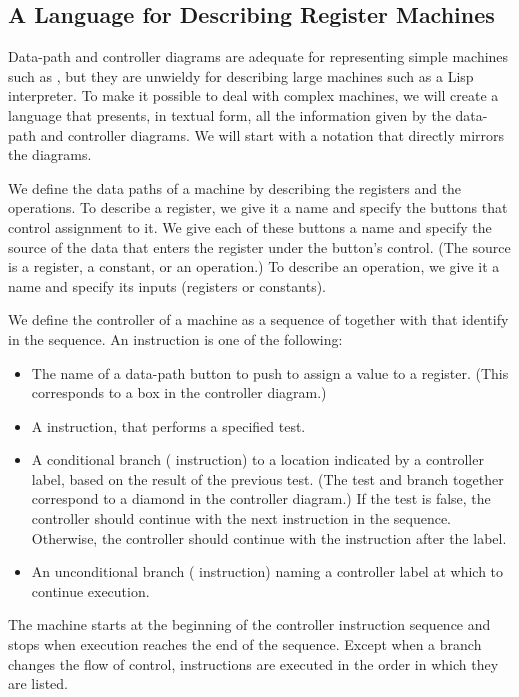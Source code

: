 \subsection{A Language for Describing Register Machines}
\label{Section 5.1.1}

Data-path and controller diagrams are adequate for representing simple machines such as , but they are unwieldy for describing large machines such as a Lisp interpreter.
To make it possible to deal with complex machines, we will create a language that presents, in textual form, all the information given by the data-path and controller diagrams.
We will start with a notation that directly mirrors the diagrams.

We define the data paths of a machine by describing the registers and the operations.
To describe a register, we give it a name and specify the buttons that control assignment to it.
We give each of these buttons a name and specify the source of the data that enters the register under the button’s control.
(The source is a register, a constant, or an operation.)
To describe an operation, we give it a name and specify its inputs (registers or constants).

We define the controller of a machine as a sequence of  together with  that identify  in the sequence.
An instruction is one of the following:
\begin{itemize}

	\item
		The name of a data-path button to push to assign a value to a register.
		(This corresponds to a box in the controller diagram.)

	\item
		A  instruction, that performs a specified test.

	\item
		A conditional branch ( instruction) to a location indicated by a controller label, based on the result of the previous test.
		(The test and branch together correspond to a diamond in the controller diagram.)
		If the test is false, the controller should continue with the next instruction in the sequence.
		Otherwise, the controller should continue with the instruction after the label.

	\item
		An unconditional branch ( instruction) naming a controller label at which to continue execution.

\end{itemize}
The machine starts at the beginning of the controller instruction sequence and stops when execution reaches the end of the sequence.
Except when a branch changes the flow of control, instructions are executed in the order in which they are listed.



